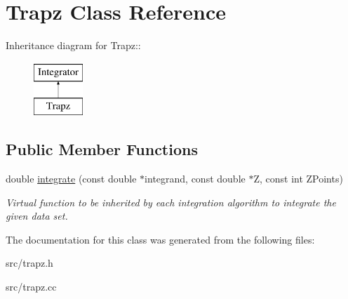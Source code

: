\hypertarget{classTrapz}{
\section{Trapz Class Reference}
\label{d8/da8/classTrapz}
}
Inheritance diagram for Trapz::\begin{figure}[H]
\begin{center}
\leavevmode
\includegraphics[height=2cm]{d8/da8/classTrapz}
\end{center}
\end{figure}
\subsection*{Public Member Functions}
\begin{DoxyCompactItemize}
\item 
\hypertarget{classTrapz_a8aee327ed631f75ef3dea7e458f71cca}{
double \hyperlink{classTrapz_a8aee327ed631f75ef3dea7e458f71cca}{integrate} (const double $\ast$integrand, const double $\ast$Z, const int ZPoints)}
\label{d8/da8/classTrapz_a8aee327ed631f75ef3dea7e458f71cca}

\begin{DoxyCompactList}\small\item\em Virtual function to be inherited by each integration algorithm to integrate the given data set. \item\end{DoxyCompactList}\end{DoxyCompactItemize}


The documentation for this class was generated from the following files:\begin{DoxyCompactItemize}
\item 
src/trapz.h\item 
src/trapz.cc\end{DoxyCompactItemize}
